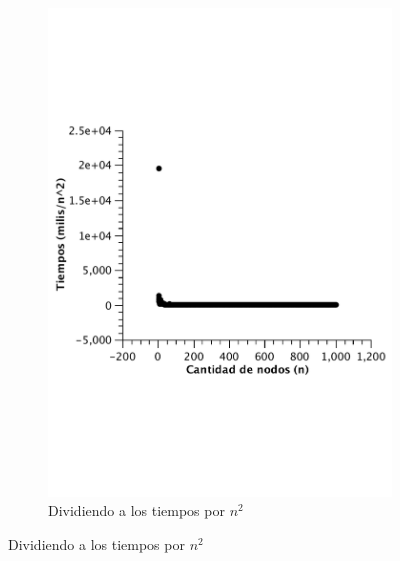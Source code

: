\begin{figure}[H]
        \begin{subfigure}[b]{0.25\textwidth}
                \includegraphics[width=\textwidth]{imagenes/vacio-matriz-3.pdf}
                \caption{Dividiendo a los tiempos por $n^2$}
        \end{subfigure}


\end{figure}
